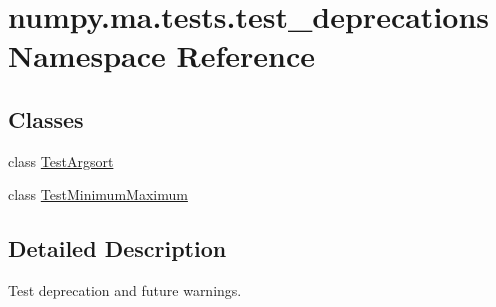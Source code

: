 \hypertarget{namespacenumpy_1_1ma_1_1tests_1_1test__deprecations}{}\section{numpy.\+ma.\+tests.\+test\+\_\+deprecations Namespace Reference}
\label{namespacenumpy_1_1ma_1_1tests_1_1test__deprecations}
\subsection*{Classes}
\begin{DoxyCompactItemize}
\item 
class \hyperlink{classnumpy_1_1ma_1_1tests_1_1test__deprecations_1_1TestArgsort}{Test\+Argsort}
\item 
class \hyperlink{classnumpy_1_1ma_1_1tests_1_1test__deprecations_1_1TestMinimumMaximum}{Test\+Minimum\+Maximum}
\end{DoxyCompactItemize}


\subsection{Detailed Description}
\begin{DoxyVerb}Test deprecation and future warnings.\end{DoxyVerb}
 